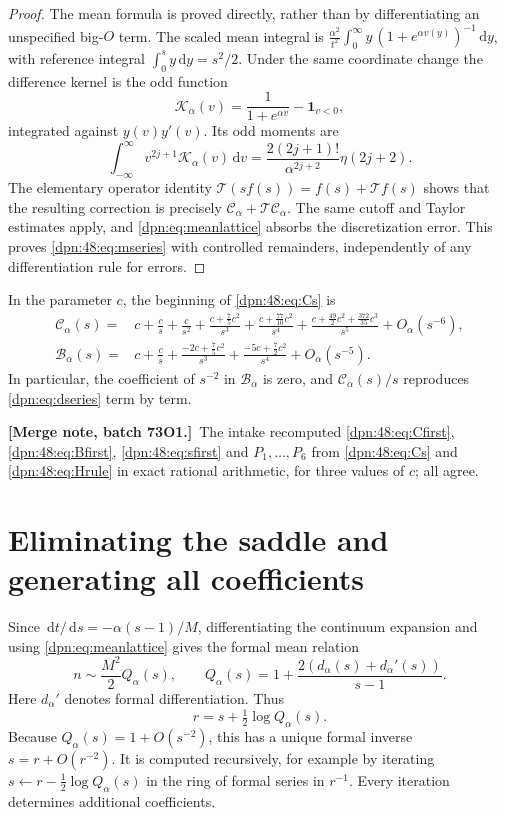 \documentclass[11pt]{article}
\numberwithin{equation}{section}
\theoremstyle{definition}\newtheorem{definition}[theorem]{Definition}
\theoremstyle{remark}\newtheorem{remark}[theorem]{Remark}
\newcommand{\dd}{\,\mathrm d}\newcommand{\ii}{\mathrm i}
\newcommand{\mergenote}[1]{\par\smallskip\noindent\textbf{[Merge note, batch 73O1.]}\ #1\par\smallskip}
\newcommand{\Cop}{\mathcal C_\alpha}
\newcommand{\Bop}{\mathcal B_\alpha}
\newcommand{\Top}{\mathcal T}
\newcommand{\ind}{\mathbf 1}
\begin{document}
\begin{proof}
The mean formula is proved directly, rather than by differentiating an
unspecified big-$O$ term.  The scaled mean integral is
$\frac{\alpha^2}{t^2}\int_0^\infty y\,(1+e^{\alpha v(y)})^{-1}\dd y$, with
reference integral $\int_0^sy\dd y=s^2/2$.  Under the same coordinate change
the difference kernel is the odd function
\[
 \mathcal K_\alpha(v)=\frac{1}{1+e^{\alpha v}}-\ind_{v<0},
\]
integrated against $y(v)y'(v)$.  Its odd moments are
\[
 \int_{-\infty}^{\infty}v^{2j+1}\mathcal K_\alpha(v)\dd v
       =\frac{2(2j+1)!}{\alpha^{2j+2}}\eta(2j+2).
\]
The elementary operator identity $\Top(sf(s))=f(s)+\Top f(s)$ shows that the
resulting correction is precisely $\Cop+\Top\Cop$.  The same cutoff and Taylor
estimates apply, and \eqref{dpn:eq:meanlattice} absorbs the discretization
error.  This proves \eqref{dpn:48:eq:mseries} with controlled remainders,
independently of any differentiation rule for errors.
\end{proof}

In the parameter $c$, the beginning of \eqref{dpn:48:eq:Cs} is
\begin{align}
 \Cop(s)={}&c+\frac cs+\frac c{s^2}
    +\frac{c+\tfrac75c^2}{s^3}
    +\frac{c+\tfrac{77}{10}c^2}{s^4}
    +\frac{c+\tfrac{49}{2}c^2+\tfrac{372}{35}c^3}{s^5}
    +O_\alpha(s^{-6}),\label{dpn:48:eq:Cfirst}\\
 \Bop(s)={}&c+\frac cs
   +\frac{-2c+\tfrac75c^2}{s^3}
   +\frac{-5c+\tfrac72c^2}{s^4}+O_\alpha(s^{-5}).\label{dpn:48:eq:Bfirst}
\end{align}
In particular, the coefficient of $s^{-2}$ in $\Bop$ is zero, and
$\Cop(s)/s$ reproduces \eqref{dpn:eq:dseries} term by term.
\mergenote{The intake recomputed \eqref{dpn:48:eq:Cfirst},
\eqref{dpn:48:eq:Bfirst}, \eqref{dpn:48:eq:sfirst} and $P_1,\dots,P_6$ from
\eqref{dpn:48:eq:Cs} and \eqref{dpn:48:eq:Hrule} in exact rational
arithmetic, for three values of $c$; all agree.}

\section{Eliminating the saddle and generating all coefficients}\label{dpn:sec:eliminate}
Since $\dd t/\dd s=-\alpha(s-1)/M$, differentiating the continuum expansion
and using \eqref{dpn:eq:meanlattice} gives the formal mean relation
\begin{equation}\label{dpn:eq:Q}
 n\sim\frac{M^2}{2}Q_\alpha(s),\qquad
 Q_\alpha(s)=1+\frac{2(d_\alpha(s)+d_\alpha'(s))}{s-1}.
\end{equation}
Here $d_\alpha'$ denotes formal differentiation. Thus
\begin{equation}\label{dpn:eq:rfroms}
 r=s+\tfrac12\log Q_\alpha(s).
\end{equation}
Because $Q_\alpha(s)=1+O(s^{-2})$, this has a unique formal inverse
$s=r+O(r^{-2})$. It is computed recursively, for example by iterating
$s\leftarrow r-\frac12\log Q_\alpha(s)$ in the ring of formal series in
$r^{-1}$. Every iteration determines additional coefficients.
\end{document}

